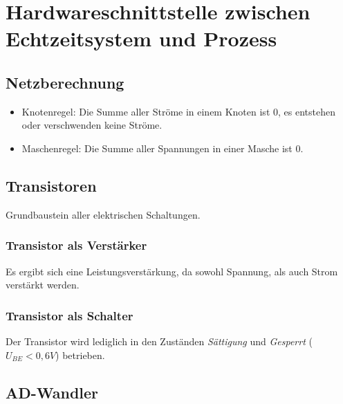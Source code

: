 \section{Hardwareschnittstelle zwischen Echtzeitsystem und Prozess}

\subsection{Netzberechnung}
\begin{itemize}
	\item Knotenregel: Die Summe aller Ströme in einem Knoten ist $0$, es entstehen oder verschwenden keine Ströme.
	\item Maschenregel: Die Summe aller Spannungen in einer Masche ist $0$.
\end{itemize}


\subsection{Transistoren}
Grundbaustein aller elektrischen Schaltungen.

\subsubsection{Transistor als Verstärker}
Es ergibt sich eine Leistungsverstärkung, da sowohl Spannung, als auch Strom verstärkt werden.


\subsubsection{Transistor als Schalter}
Der Transistor wird lediglich in den Zuständen \textit{Sättigung} und \textit{Gesperrt} ($U_{BE} < 0,6 V$) betrieben.


\subsection{AD-Wandler}

